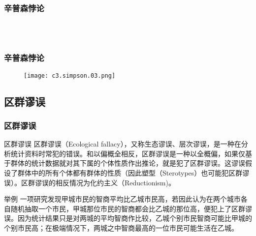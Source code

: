 \begin{frame}
  \frametitle{辛普森悖论}
  \begin{figure}
    \centering
    \\
    \vspace{0.5em}
    \\
    \vspace{0.5em}
  \end{figure}
\end{frame}

\begin{frame}
  \frametitle{辛普森悖论}
  \begin{figure}
    \centering
    \texttt{[image: c3.simpson.03.png]}
  \end{figure}
\end{frame}

\subsection{区群谬误}
\begin{frame}
  \frametitle{区群谬误}
  \begin{block}{区群谬误}
    区群谬误（Ecological fallacy），又称生态谬误、层次谬误，是一种在分析统计资料时常犯的错误。和以偏概全相反，区群谬误是一种以全概偏，如果仅基于群体的统计数据就对其下属的个体性质作出推论，就是犯了区群谬误。这谬误假设了群体中的所有个体都有群体的性质（因此塑型（Sterotypes）也可能犯区群谬误）。区群谬误的相反情况为化约主义（Reductionism)。
  \end{block}
  \pause
  \begin{block}{举例}
一项研究发现甲城市民的智商平均比乙城市民高，若因此认为在两个城市各自随机抽取一个市民，甲城那位市民的智商都会比乙城的那位高，便犯上了区群谬误。因为统计结果只是对两城的平均智商作比较，乙城个别市民智商可能比甲城的个别市民高；在极端情况下，两城之中智商最高的一位市民可能生活在乙城。
  \end{block}
\end{frame}

